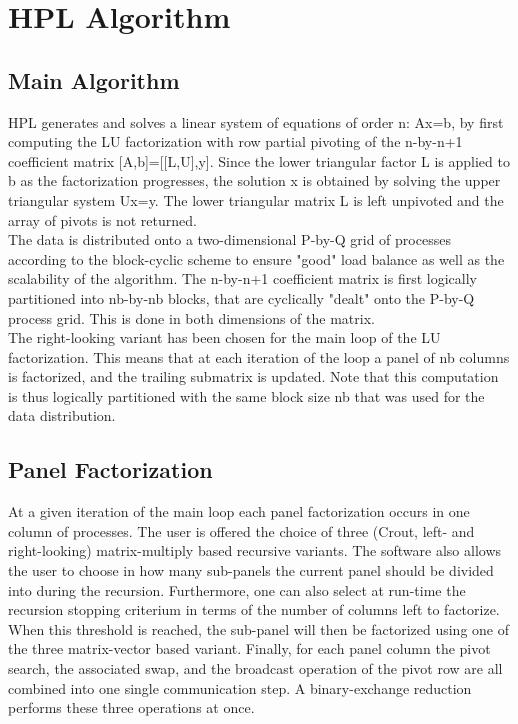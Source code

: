 \documentclass[a4paper, 11pt]{article}
\begin{document}
\section{HPL Algorithm}

\subsection{Main Algorithm}

HPL generates and solves a linear system of equations of order n: Ax=b, by first computing the LU factorization with row partial pivoting of the n-by-n+1 coefficient matrix [A,b]=[[L,U],y]. Since the lower triangular factor L is applied to b as the factorization progresses, the solution x is obtained by solving the upper triangular system Ux=y. The lower triangular matrix L is left unpivoted and the array of pivots is not returned.\cite{website:paper} \\

The data is distributed onto a two-dimensional P-by-Q grid of processes according to the block-cyclic scheme to ensure "good" load balance as well as the scalability of the algorithm. The n-by-n+1 coefficient matrix is first logically partitioned into nb-by-nb blocks, that are cyclically "dealt" onto the P-by-Q process grid. This is done in both dimensions of the matrix. \\

The right-looking variant has been chosen for the main loop of the LU factorization. This means that at each iteration of the loop a panel of nb columns is factorized, and the trailing submatrix is updated. Note that this computation is thus logically partitioned with the same block size nb that was used for the data distribution. \\

\subsection{Panel Factorization}

At a given iteration of the main loop each panel factorization occurs in one column of processes. The user is offered the choice of three (Crout, left- and right-looking) matrix-multiply based recursive variants. The software also allows the user to choose in how many sub-panels the current panel should be divided into during the recursion. Furthermore, one can also select at run-time the recursion stopping criterium in terms of the number of columns left to factorize. When this threshold is reached, the sub-panel will then be factorized using one of the three matrix-vector based variant. Finally, for each panel column the pivot search, the associated swap, and the broadcast operation of the pivot row are all combined into one single communication step. A binary-exchange reduction performs these three operations at once.
\end{document}

